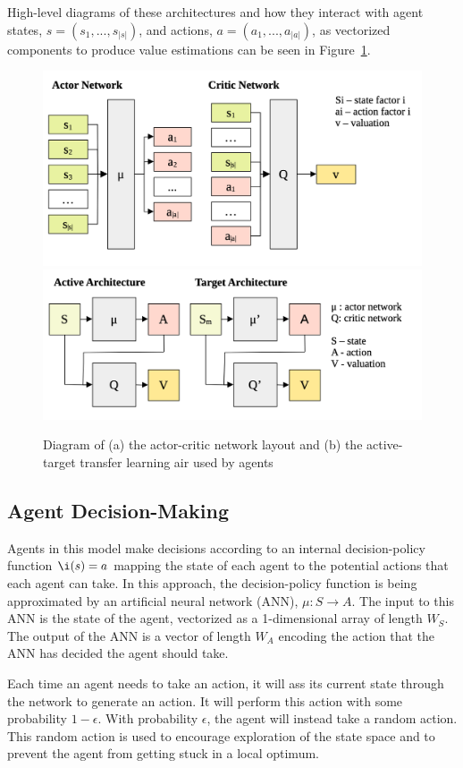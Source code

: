 High-level diagrams of these architectures and how they interact with
agent states, $s = \left(s_1, ..., s_{|s|}\right)$, 
and actions, $a = \left(a_1, ..., a_{|a|}\right)$,
as vectorized components to produce value estimations
can be seen in Figure~\ref{fig:farm_ddqn}.

\begin{figure}
    {\includegraphics[width=.46\textwidth]{figure/ddqn1}}
    \hfill
    {\includegraphics[width=.46\textwidth]{figure/ddqn2}}
    \caption{Diagram of (a) the actor-critic network layout 
    and (b) the active-target transfer learning air used by
    agents}
    \label{fig:farm_ddqn}
\end{figure}

\subsection{Agent Decision-Making}
\label{subsec:farm_methods_decisions}

Agents in this model make decisions according to an internal decision-policy
function $\i(s)=a$ mapping the state of each agent to the potential actions 
that each agent can take.
In this approach, the decision-policy function is being approximated by
an artificial neural network (ANN), $\mu:S\rightarrow A$.
The input to this ANN is the state of the agent, vectorized as a 1-dimensional
array of length $W_S$.
The output of the ANN is a vector of length $W_A$ encoding the action that
the ANN has decided the agent should take.

Each time an agent needs to take an action,
it will ass its current state through the network to generate an action.
It will perform this action with some probability $1 - \epsilon$.
With probability $\epsilon$, the agent will instead take a random action.
This random action is used to encourage exploration of the state space
and to prevent the agent from getting stuck in a local optimum.


